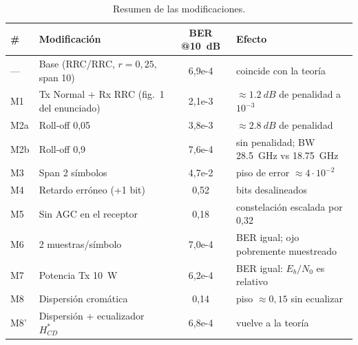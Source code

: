 \documentclass[10pt,a4paper]{article}
\begin{document}
\begin{table}[H]\centering\small
\caption{Resumen de las modificaciones.}\label{tab:mods}
\begin{tabular}{llcl}\toprule
\# & Modificación & BER @\SI{10}{dB} & Efecto\\\midrule
--- & Base (RRC/RRC, $r=0{,}25$, span 10) & 6,9e-4 & coincide con la teoría\\
M1 & Tx Normal + Rx RRC (fig.~1 del enunciado) & 2,1e-3 & $\approx\SI{1.2}{dB}$ de penalidad a $10^{-3}$\\
M2a & Roll-off 0,05 & 3,8e-3 & $\approx\SI{2.8}{dB}$ de penalidad\\
M2b & Roll-off 0,9 & 7,6e-4 & sin penalidad; BW \SI{28.5}{GHz} vs \SI{18.75}{GHz}\\
M3 & Span 2 símbolos & 4,7e-2 & piso de error $\approx4\cdot10^{-2}$\\
M4 & Retardo erróneo (+1 bit) & 0,52 & bits desalineados\\
M5 & Sin AGC en el receptor & 0,18 & constelación escalada por 0,32\\
M6 & 2 muestras/símbolo & 7,0e-4 & BER igual; ojo pobremente muestreado\\
M7 & Potencia Tx \SI{10}{W} & 6,2e-4 & BER igual: $E_b/N_0$ es relativo\\
M8 & Dispersión cromática & 0,14 & piso $\approx0{,}15$ sin ecualizar\\
M8' & Dispersión + ecualizador $H^*_{CD}$ & 6,8e-4 & vuelve a la teoría\\\bottomrule
\end{tabular}\end{table}
\end{document}
